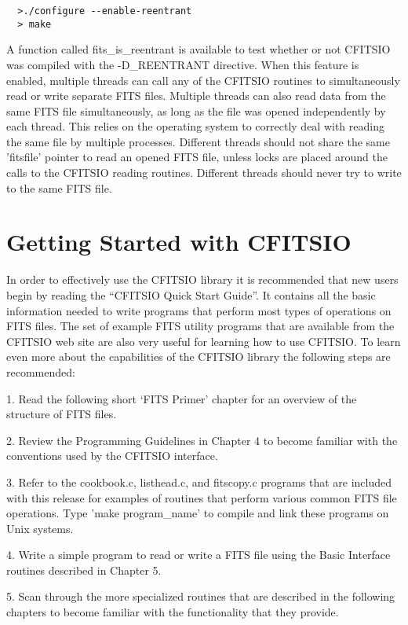 \documentclass[11pt]{book}
\begin{document}
\begin{verbatim}
  >./configure --enable-reentrant
  > make
\end{verbatim}
A function called fits\_is\_reentrant is available to test
whether or not CFITSIO was compiled with the -D\_REENTRANT
directive.  When this feature is enabled, multiple threads can
call any of the CFITSIO routines
to simultaneously read or write separate
FITS files.  Multiple threads can also read data from
the same FITS file simultaneously, as long as the file
was opened independently by each thread.  This relies on
the operating system to correctly deal with reading the
same file by multiple processes.  Different threads should
not share the same 'fitsfile' pointer to read an opened
FITS file, unless locks are placed around the calls to
the CFITSIO reading routines.
Different threads should never try to write to the same
FITS file.


\section{Getting Started with CFITSIO}

In order to effectively use the CFITSIO library it is recommended that
new users begin by reading the ``CFITSIO Quick Start Guide''.  It
contains all the basic information needed to write programs that
perform most types of operations on FITS files.  The set of example
FITS utility programs that are available from the CFITSIO web site are
also very useful for learning how to use CFITSIO.  To learn even more
about the capabilities of the CFITSIO library the following steps are
recommended:

1.  Read the following short `FITS Primer' chapter for an overview of
the structure of FITS files.

2. Review the Programming Guidelines in Chapter 4 to become familiar
with the conventions used by the CFITSIO interface.

3.  Refer to the cookbook.c, listhead.c, and fitscopy.c programs that
are included with this release for examples of routines that perform
various common FITS file operations.  Type 'make program\_name' to
compile and link these programs on Unix systems.

4.  Write a simple program to read or write a FITS file using the Basic
Interface routines described in Chapter 5.

5.  Scan through the more specialized routines that are described in
the following chapters to become familiar with the functionality that
they provide.
\end{document}
